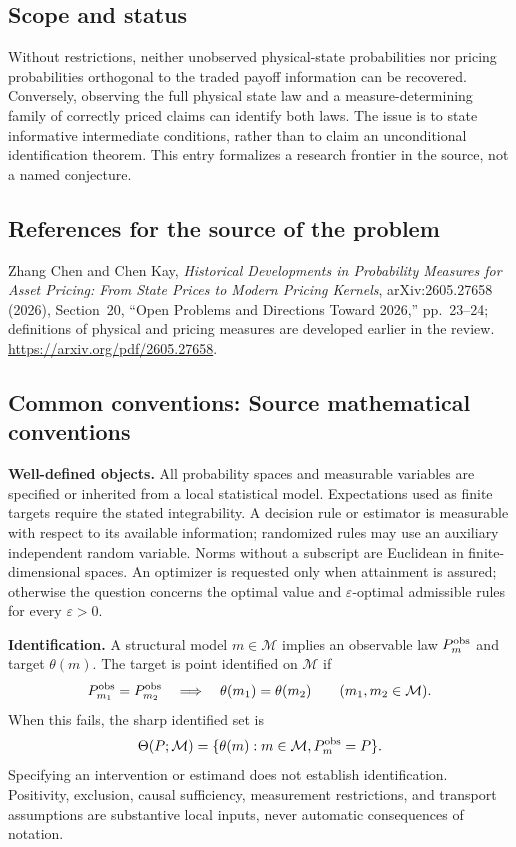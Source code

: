 \documentclass[11pt,a4paper]{article}
\begin{document}
\subsection*{Scope and status}
Without restrictions, neither unobserved physical-state probabilities nor pricing probabilities orthogonal to the traded payoff information can be recovered. Conversely, observing the full physical state law and a measure-determining family of correctly priced claims can identify both laws. The issue is to state informative intermediate conditions, rather than to claim an unconditional identification theorem. This entry formalizes a research frontier in the source, not a named conjecture.
\subsection*{References for the source of the problem}
Zhang Chen and Chen Kay, \emph{Historical Developments in Probability Measures for Asset Pricing: From State Prices to Modern Pricing Kernels}, arXiv:2605.27658 (2026), Section~20, ``Open Problems and Directions Toward 2026,'' pp.~23--24; definitions of physical and pricing measures are developed earlier in the review. \url{https://arxiv.org/pdf/2605.27658}.

\subsection*{Common conventions: Source mathematical conventions}

\textbf{Well-defined objects.}
All probability spaces and measurable variables are specified or inherited
from a local statistical model. Expectations used as finite targets require
the stated integrability. A decision rule or estimator is measurable with
respect to its available information; randomized rules may use an auxiliary
independent random variable. Norms without a subscript are Euclidean in
finite-dimensional spaces. An optimizer is requested only when attainment
is assured; otherwise the question concerns the optimal value and
$\varepsilon$-optimal admissible rules for every $\varepsilon>0$.

\textbf{Identification.}
A structural model $m\in\mathcal M$ implies an observable law
$P_m^{\rm obs}$ and target $\theta(m)$. The target is point identified on
$\mathcal M$ if
\[
 P_{m_1}^{\rm obs}=P_{m_2}^{\rm obs}
 \quad\Longrightarrow\quad\theta(m_1)=\theta(m_2)
 \qquad(m_1,m_2\in\mathcal M).
\]
When this fails, the sharp identified set is
\[
 \Theta(P;\mathcal M)=\{\theta(m):m\in\mathcal M,
                                  P_m^{\rm obs}=P\}.
\]
Specifying an intervention or estimand does not establish identification.
Positivity, exclusion, causal sufficiency, measurement restrictions, and
transport assumptions are substantive local inputs, never automatic
consequences of notation.
\end{document}
